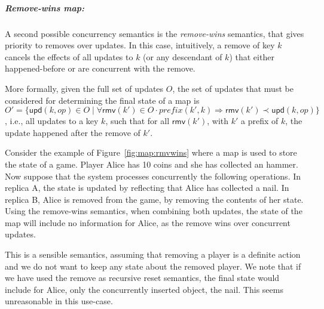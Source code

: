 \documentclass[12pt]{article}
\begin{document}
\subparagraph{Remove-wins map:}
A second possible concurrency semantics is the \emph{remove-wins} semantics, 
that gives priority to removes over updates. 
In this case, intuitively, a remove of key $k$ cancels the effects of all updates to $k$ 
(or any descendant of $k$) that either happened-before or are concurrent with the remove.

More formally, given the full set of updates $O$, the set of updates that must be 
considered for determining the final state of a map is 
$O' = \{\mathsf{upd}(k,op) \in O \mid \forall \mathsf{rmv}(k') \in O \cdot \mathit{prefix}(k',k) \Rightarrow 
\mathsf{rmv}(k') \prec \mathsf{upd}(k,op)\}$, i.e., 
all updates to a key $k$, such that for all $\mathsf{rmv}(k')$, with $k'$ a prefix of $k$,
the update happened after the remove of $k'$.

Consider the example of Figure~\ref{fig:map:rmvwins} where a map is used 
to store the state of a game. Player Alice has 10 coins and she has collected an hammer.
Now suppose that the system processes concurrently the following operations. 
In replica A, the state is updated by reflecting that Alice has collected a nail. 
In replica B, Alice is removed from the game, by removing the contents of her state.
Using the remove-wins semantics, when combining both updates, the state of the map
will include no information for Alice, as the remove wins over concurrent updates.

This is a sensible semantics, assuming that removing a player is a definite action and
we do not want to keep any state about the removed player.
We note that if we have used the remove as recursive reset semantics, the final state
would include for Alice, only the concurrently inserted object, the nail. 
This seems unreasonable in this use-case. 


\end{document}
